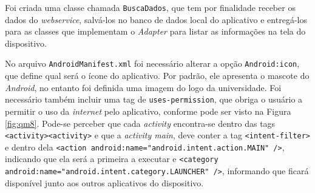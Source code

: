 	
		
		
	\par Foi criada uma classe chamada \texttt{BuscaDados}, que tem por finalidade
receber os dados do \textit{webservice}, salvá-los no banco de dados local do
aplicativo e entregá-los para as classes que implementam o \textit{Adapter}
para listar as informações na tela do dispositivo.
	
	\par No arquivo \texttt{AndroidManifest.xml} foi necessário alterar a opção
\texttt{Android:icon}, que define qual será o ícone do aplicativo. Por padrão,
ele apresenta o mascote do \textit{Android}, no entanto foi definida uma imagem
do logo da universidade. Foi necessário também incluir uma tag de
\texttt{uses-permission}, que obriga o usuário a permitir o uso da
\textit{internet} pelo aplicativo, conforme pode ser visto na Figura
\ref{fig:qm8}. Pode-se perceber que cada \textit{activity} encontra-se
dentro das tags \texttt{<activity><\/activity>} e que a \textit{activity main},
deve conter a tag \texttt{<intent-filter>} e dentro dela {\tiny{\texttt{<action
android:name="android.intent.action.MAIN" />}}}, indicando que
ela será a primeira a executar e {\tiny{\texttt{<category
android:name="android.intent.category.LAUNCHER" />}}}, informando que ficará
disponível junto aos outros aplicativos do dispositivo.
	
